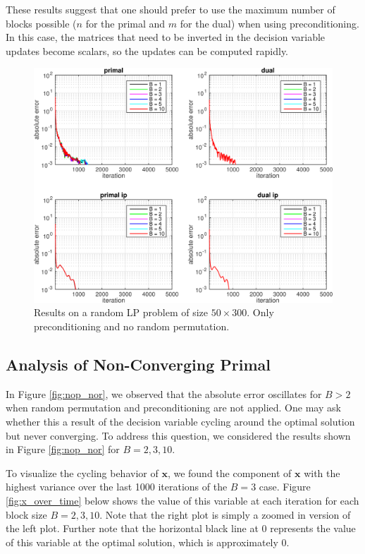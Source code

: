 \documentclass{article}
\begin{document}
{These results suggest that one should prefer to use the maximum number of blocks possible ($n$ for the primal and $m$ for the dual) when using preconditioning. In this case, the matrices that need to be inverted in the decision variable updates become scalars, so the updates can be computed rapidly.
\newline
\newline
\newline
\newline
\begin{figure}[h]
	\includegraphics[width=\textwidth]{../figures/precond_norndperm.png}
	\caption{Results on a random LP problem of size $50 \times 300$. Only preconditioning and no random permutation.}
	\label{fig:p_nor}
\end{figure}

\newpage
\subsection*{Analysis of Non-Converging Primal}

In Figure \ref{fig:nop_nor}, we observed that the absolute error oscillates for $B>2$ when random permutation and preconditioning are not applied. One may ask whether this a result of the decision variable cycling around the optimal solution but never converging. To address this question, we considered the results shown in Figure \ref{fig:nop_nor} for $B=2,3,10$.

To visualize the cycling behavior of $\mathbf{x}$, we found the component of $\mathbf{x}$ with the highest variance over the last 1000 iterations of the $B=3$ case. Figure \ref{fig:x_over_time} below shows the value of this variable at each iteration for each block size $B=2,3,10$. Note that the right plot is simply a zoomed in version of the left plot. Further note that the horizontal black line at 0 represents the value of this variable at the optimal solution, which is approximately 0.

}
\end{document}

